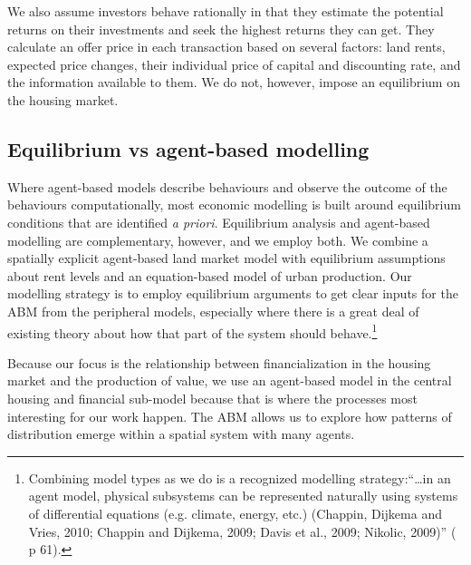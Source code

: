 


We also assume investors behave rationally in that they estimate the potential returns on their investments and seek the highest returns they can get. They calculate an offer price in each transaction based on several factors: land rents, expected price changes, their individual price of capital and discounting rate, and the information available to them. We do not, however, impose an equilibrium on the housing market.


\subsection{Equilibrium vs agent-based modelling}
Where agent-based models describe behaviours and observe the outcome of the behaviours computationally, most economic modelling is built around equilibrium conditions that are identified \textit{a priori}. Equilibrium analysis and agent-based modelling are complementary, however, and we employ both. We combine a spatially explicit agent-based land market model with equilibrium assumptions about rent levels and an equation-based model of urban production. Our modelling strategy is to employ equilibrium arguments to get clear inputs for the \gls{ABM} from the peripheral models, especially where there is a great deal of existing theory about how that part of the system should behave.\footnote{Combining model types as we do is a recognized modelling strategy:``\dots in an agent model, physical subsystems can be represented naturally using systems of differential equations (e.g. climate, energy, etc.)  (Chappin, Dijkema and Vries, 2010; Chappin and Dijkema, 2009; Davis et al., 2009; Nikolic, 2009)''  (\cite{chappin_simulating_2011} p 61).} 

Because our focus is the relationship between financialization in the housing market and the production of value, we use an agent-based model in the central housing and financial sub-model because that is where the processes most interesting for our work happen. The ABM allows us to explore how patterns of distribution emerge within a spatial system with many agents.

